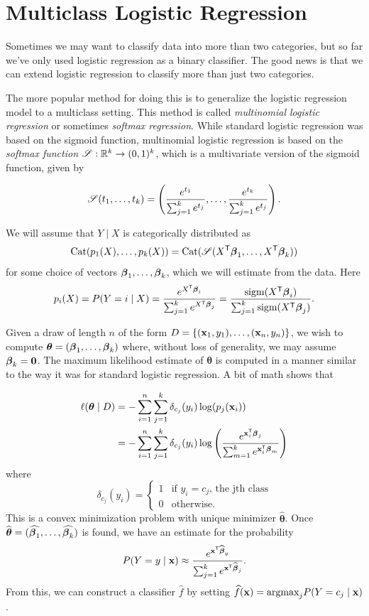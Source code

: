 \section*{Multiclass Logistic Regression}

Sometimes we may want to classify data into more than two categories, but so far we've only used logistic regression as a binary classifier.
The good news is that we can extend logistic regression to classify more than just two categories.

The more popular method for doing this is to generalize the logistic regression model to a multiclass setting.
This method is called \emph{multinomial logistic regression} or sometimes \emph{softmax regression}.
While standard logistic regression was based on the sigmoid function, multinomial logistic regression is based on the \emph{softmax function} $\mathscr{S}: \mathbb{R}^k \to (0,1)^k$, which is a multivariate version of the sigmoid function, given by

\begin{equation}
    \mathscr{S}(t_1,\dots,t_k) = \left(\frac{e^{t_1}}{\sum_{j=1}^k e^{t_j}}, \dots, \frac{e^{t_k}}{\sum_{j=1}^k e^{t_j}}\right).
\end{equation}

\noindent We will assume that $Y \mid X$ is categorically distributed as
\[
    \text{Cat}(p_1(X),\dots, p_k (X)) = \text{Cat}(\mathscr{S}(X^\mathsf{T} \boldsymbol\beta_1, \dots, X^\mathsf{T} \boldsymbol\beta_k))
\]
for some choice of vectors $\boldsymbol\beta_1,\dots, \boldsymbol\beta_k$, which we will estimate from the data.  Here
\[
p_i(X) = P(Y = i \mid X) = \frac{e^{X^\mathsf{T} \boldsymbol\beta_i}}{\sum_{j=1}^k e^{X^\mathsf{T} \boldsymbol\beta_j}}
 = \frac{\text{sigm}(X^\mathsf{T} \boldsymbol\beta_i)}{\sum_{j=1}^k \text{sigm}(X^\mathsf{T} \boldsymbol\beta_j)}.
\]

Given a draw of length $n$ of the form $D = \{(\mathbf{x}_1,y_1),\dots, (\mathbf{x}_n,y_n)\}$, we wish to compute $\boldsymbol{\theta} = (\boldsymbol\beta_1,\dots, \boldsymbol\beta_k)$ where, without loss of generality, we may assume $\boldsymbol\beta_k=\boldsymbol{0}$.
The maximum likelihood estimate of $\boldsymbol{\theta}$ is computed in a manner similar to the way it was for standard logistic regression.
A bit of math shows that

\begin{align*}
    \ell(\boldsymbol{\theta}\mid D)
    & = - \sum_{i=1}^n \sum_{j = 1}^k \delta_{c_j} (y_i) \log (p_j(\mathbf{x}_i)) \\
    & = - \sum_{i=1}^n \sum_{j = 1}^k \delta_{c_j} (y_i) \log \left(  \frac{e^{\mathbf{x}_i^\mathsf{T}\boldsymbol\beta_j}}{\sum_{m=1}^k e^{\mathbf{x}_i^\mathsf{T}\boldsymbol\beta_m}} \right)
\end{align*}
where
\[
    \delta_{c_j} (y_i) = \begin{cases}
    1 & \text{if $y_i = c_j$, the jth class}\\
    0 & \text{otherwise}.
    \end{cases}
\]
This is a convex minimization problem with unique minimizer $\widehat{\boldsymbol{\theta}}$.
Once $\widehat{\boldsymbol{\theta}} = (\widehat{\boldsymbol\beta_1},\dots, \widehat{\boldsymbol\beta_k})$ is found, we have an estimate for the probability
\[
    P(Y=y \mid \mathbf{x}) \approx \frac{e^{\mathbf{x}^\mathsf{T} \widehat{\boldsymbol\beta}_y}}{\sum_{j=1}^k e^{\mathbf{x}^\mathsf{T} \widehat{\boldsymbol\beta}_j}}.
\]
From this, we can construct a classifier $\widehat{f}$ by setting $\widehat{f}(\mathbf{x}) = \text{argmax}_j P(Y=c_j \mid \mathbf{x}) $.

